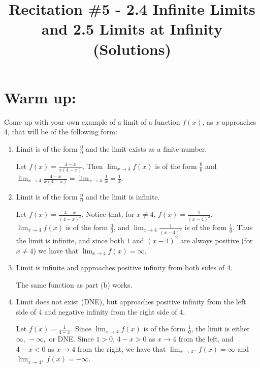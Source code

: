 \documentclass[nooutcomes]{ximera}
\title{Recitation \#5 - 2.4 Infinite Limits and 2.5 Limits at Infinity (Solutions)}
\begin{document}
\begin{abstract}		\end{abstract}
\maketitle

\section*{Warm up:} 
Come up with your own example of a limit of a function $f(x)$, as $x$ approaches 4, that will be of the following form:

	\begin{enumerate}[label=(\alph*)]
	
	\item  Limit is of the form $\frac{0}{0}$ and the limit exists as a finite number.
		\begin{freeResponse}
		Let $f(x) = \frac{4-x}{x(4-x)}$.  Then $\lim_{x \to 4} f(x)$ is of the form $\frac{0}{0}$ and $\lim_{x \to 4} \frac{4-x}{x(4-x)} = \lim_{x \to 4} \frac{1}{x} = \frac{1}{4} $.  
		\end{freeResponse}
	
	
	
	\item  Limit is of the form $\frac{0}{0}$ and the limit is infinite.
		\begin{freeResponse}
		Let $f(x) = \frac{4-x}{(4-x)^3}$.  Notice that, for $x \neq 4$, $f(x) = \frac{1}{(x-4)^2}$.  $\lim_{x \to 4} f(x)$ is of the form $\frac{0}{0}$, and $\lim_{x \to 4} \frac{1}{(x-4)^2} $ is of the form $\frac{1}{0}$.  Thus the limit is infinite, and since both $1$ and $(x-4)^2$ are always positive (for $x \neq 4$) we have that $\lim_{x \to 4} f(x) = \infty $.  		
		\end{freeResponse}
	
	\item  Limit is infinite and approaches positive infinity from both sides of 4.
		\begin{freeResponse}
		 The same function as part (b) works.  
		 \end{freeResponse}
	
	
	
	\item  Limit does not exist (DNE), but approaches positive infinity from the left side of 4 and negative infinity from the right side of 4.
		\begin{freeResponse}  Let $f(x) = \frac{1}{4-x}$.  Since $\lim_{x \to 4} f(x)$ is of the form $\frac{1}{0}$, the limit is either $\infty, \, -\infty, $ or DNE.  Since $1 > 0$, $4-x > 0$ as $x \to 4$ from the left, and $4-x < 0$ as $x \to 4$ from the right, we have that $ \lim_{x \to 4^-} f(x) = \infty  $ and $ \lim_{x \to 4^+} f(x) = - \infty  $.
		\end{freeResponse}
	
	\end{enumerate}
\end{document}
